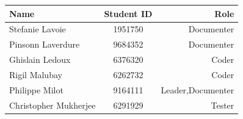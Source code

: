 \documentclass{article}
\begin{document}
\medskip
\begin{center}
\begin{tabular}{| l | c | r |}
\hline
Name & Student ID & Role \\
\hline
\hline
Stefanie Lavoie & 1951750 & Documenter\\
\hline
Pinsonn Laverdure & 9684352 & Documenter\\
\hline
Ghislain Ledoux & 6376320 & Coder\\
\hline
Rigil Malubay & 6262732 & Coder\\
\hline
Philippe Milot & 9164111 & Leader,Documenter \\
\hline
Christopher Mukherjee & 6291929 & Tester\\
\hline
\end{tabular}
\end{center}
\end{document}

